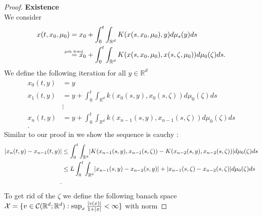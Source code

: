 \begin{proof}
  \textbf{Existence} \\[1ex]
 We consider 
 \begin{align*}
   x(t,x_0,\mu_0) &= x_0 + \int_0^{t} \int_{\mathbb{R}^{d } } K(x(s,x_0,\mu_0),y) d\mu_s(y) ds \\ 
                  &\myS{psh frwd.}{=} x_0 + \int_0^{t} \int_{\mathbb{R}^{d } } K(x(s,x_0,\mu_0),x(s,\zeta,\mu_0))  d\mu_0(\zeta ) ds
 .\end{align*}
 We define the following iteration  for all $y \in  \mathbb{R}^{d } $
 \begin{align*}
    x_0(t,y) &= y \\
    x_1(t,y) &= y + \int_0^{t} \int_{\mathbb{R}^{d}  } k(x_0(s,y),x_0(s,\zeta )) d\mu_0(\zeta ) ds \\ 
             &\vdots \\ 
    x_n(t,y) &= y + \int_0^{t} \int_{\mathbb{R}^{d}  } k(x_{n-1}(s,y),x_{n-1}(s,\zeta )) d\mu_0(\zeta ) ds \\ 
 .\end{align*}
 Similar to our proof in \label{picard1} we show the sequence is cauchy :
 \begin{align*}
   \lvert x_n(t,y) - x_{n-1}(t,y)\rvert &\le \int_0^{t} \int_{\mathbb{R}^{d} }  \lvert K(x_{n-1}(s,y),x_{n-1}(s,\zeta )) - K(x_{n-2}(s,y),x_{n-2}(s,\zeta ))\rvert d\mu_0(\zeta ) ds \\
                                 &\le L \int_0^{t} \int_{\mathbb{R}^{d} } \lvert x_{n-1}(s,y) - x_{n-2}(s,y)\rvert +  \lvert x_{n-1}(s,\zeta ) - x_{n-2}(s,\zeta )\rvert d\mu_0(\zeta ) ds\\
 .\end{align*}
 To get rid of the $\zeta $ we define  the following banach space $\mathcal{X}  = \{v \in  \mathcal{C}(\mathbb{R}^{d };\mathbb{R}^{d}  ) : \sup_x \frac{\lvert v(x)\rvert}{1+\lvert x\rvert} < \infty\}  $ with norm 

\end{proof}
